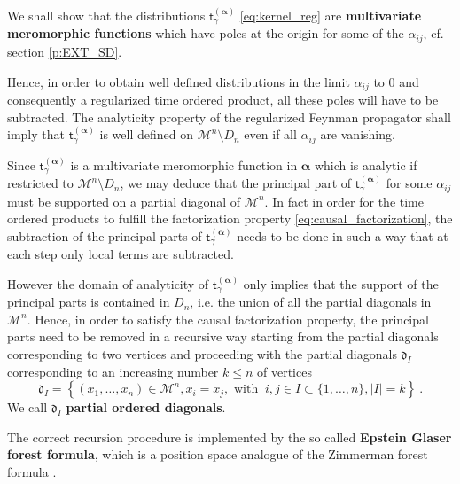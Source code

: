 \documentclass[11pt]{book}
\newcommand{\alphabd}{\boldsymbol{\alpha}}
\newcommand{\abs}[1]{\left|#1\right|}
\newcommand{\Mcal}{\mathcal{M}}
\newcommand{\drak}{\mathfrak{d}}
\newcommand{\tsf}{\mathsf{t}}
\theoremstyle{break}
\begin{document}
\bigskip


We shall show that the distributions $\tsf^{(\alphabd)}_\gamma$ \eqref{eq:kernel_reg} are \textbf{multivariate meromorphic functions} which have poles at the origin for some of the $\alpha_{ij}$, cf. section \ref{p:EXT_SD}. 


Hence, in order to obtain well defined distributions in the limit $\alpha_{ij}$ to $0$ and consequently a regularized time ordered product, all these poles will have to be subtracted. The analyticity property of the regularized Feynman propagator shall imply that $\tsf^{(\alphabd)}_\gamma$ is well defined on $ \Mcal^n \setminus D_n $ even if all $\alpha_{ij}$ are vanishing. 


Since $\tsf^{(\alphabd)}_\gamma$ is a multivariate meromorphic function in $\alphabd$  which is analytic if restricted to $\Mcal^n\setminus D_n$, we may deduce that the principal part of $\tsf^{(\alphabd)}_\gamma$ for some $\alpha_{ij}$ must be supported on a partial diagonal of $\Mcal^n$. In fact in order for the time ordered products to fulfill the factorization property \eqref{eq:causal_factorization}, the subtraction of the principal parts of $\tsf^{(\alphabd)}_\gamma$ needs to be done in such a way that at each step only local terms are subtracted. 

However the domain of analyticity of $\tsf^{(\alphabd)}_\gamma$ only implies that the support of the principal parts is contained in $D_n$, i.e. the union of all the partial diagonals in $\Mcal^n$. Hence, in order to satisfy the causal factorization property, the principal parts need to be removed in a recursive way starting from the partial diagonals corresponding to two vertices and proceeding with the partial diagonals $\drak_{I}$ corresponding to an increasing number $k \leq n$ of vertices 
%
\begin{equation*}
\drak_{I} = \left\{ (x_1,\dots, x_n) \in \Mcal^n, x_i=x_j, \mbox{ with } \ i,j \in I\subset \{1,\dots, n\} , \abs{I} = k \right\} \ . 
\end{equation*}
%
We call $\drak_{I}$ \textbf{partial ordered diagonals}. 


\bigskip


The correct recursion procedure is implemented by the so called \textbf{Epstein Glaser forest formula}, which is a position space analogue of the Zimmerman forest formula \cite{duetsch_dimensional_2014}. 
\end{document}
